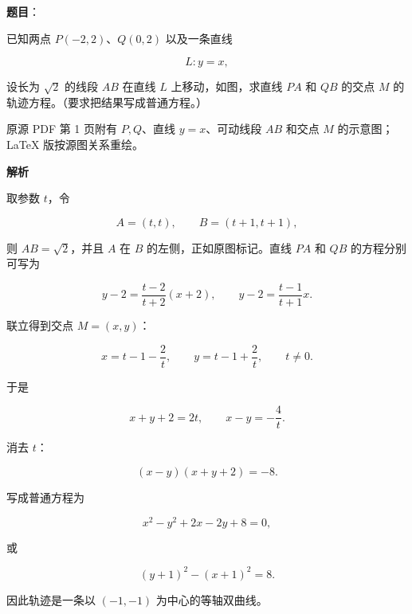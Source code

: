 \begin{answer}

\textbf{题目}：

已知两点 $P(-2,2)$、$Q(0,2)$ 以及一条直线

\nopagebreak[4]
\[
L:y=x,
\]

设长为 $\sqrt2$ 的线段 $AB$ 在直线 $L$ 上移动，如图，求直线 $PA$ 和 $QB$ 的交点 $M$ 的轨迹方程。（要求把结果写成普通方程。）

\begin{gktip}
原源 PDF 第 1 页附有 $P,Q$、直线 $y=x$、可动线段 $AB$ 和交点 $M$ 的示意图；LaTeX 版按源图关系重绘。
\end{gktip}
\nopagebreak[4]
\begin{center}\end{center}
\nopagebreak[4]
\textbf{解析}

取参数 $t$，令

\nopagebreak[4]
\[
A=(t,t),\qquad B=(t+1,t+1),
\]

则 $AB=\sqrt2$，并且 $A$ 在 $B$ 的左侧，正如原图标记。直线 $PA$ 和 $QB$ 的方程分别可写为

\nopagebreak[4]
\[
y-2=\frac{t-2}{t+2}(x+2),
\qquad
y-2=\frac{t-1}{t+1}x.
\]

联立得到交点 $M=(x,y)$：

\nopagebreak[4]
\[
x=t-1-\frac2t,\qquad
y=t-1+\frac2t,
\qquad t\ne0.
\]

于是

\nopagebreak[4]
\[
x+y+2=2t,\qquad x-y=-\frac4t.
\]

消去 $t$：

\nopagebreak[4]
\[
(x-y)(x+y+2)=-8.
\]

写成普通方程为

\nopagebreak[4]
\[
x^2-y^2+2x-2y+8=0,
\]

或

\nopagebreak[4]
\[
(y+1)^2-(x+1)^2=8.
\]

因此轨迹是一条以 $(-1,-1)$ 为中心的等轴双曲线。


\end{answer}
